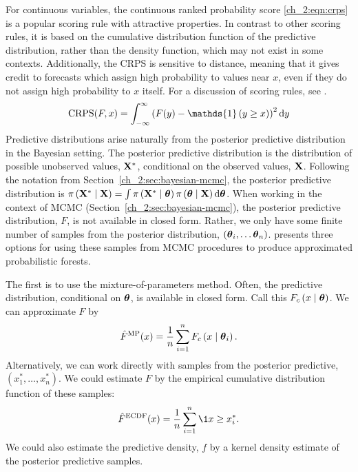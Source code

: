 For continuous variables, the continuous ranked probability score \eqref{ch_2:eqn:crps} is a popular scoring rule with attractive properties.
In contrast to other scoring rules, it is based on the cumulative distribution function of the predictive distribution, rather than the density function, which may not exist in some contexts.
Additionally, the CRPS is sensitive to distance, meaning that it gives credit to forecasts which assign high probability to values near \( x \), even if they do not assign high probability to \( x \) itself.
For a discussion of scoring rules, see \citet{gneiting2007strictly}.
\begin{equation}
    \operatorname{CRPS}(F, x) = \int_{-\infty}^{\infty} \left( F(y) - \mathds{1} \left( y \geq x \right) \right)^2 \rmd y
    \label{ch_2:eqn:crps}
\end{equation}
Predictive distributions arise naturally from the posterior predictive distribution in the Bayesian setting.
The posterior predictive distribution is the distribution of possible unobserved values, \( \mathbf{X}^* \), conditional on the observed values, \( \mathbf{X} \).
Following the notation from Section~\ref{ch_2:sec:bayesian-mcmc}, the posterior predictive distribution is \( \pi \left( \mathbf{X}^* \mid \mathbf{X} \right) = \int \pi \left( \mathbf{X}^* \mid \boldsymbol{\theta} \right) \pi \left( \boldsymbol{\theta} \mid \mathbf{X} \right) \mathrm{d} \boldsymbol{\theta} \).
When working in the context of MCMC (Section~\ref{ch_2:sec:bayesian-mcmc}), the posterior predictive distribution, \( F \), is not available in closed form.
Rather, we only have some finite number of samples from the posterior distribution, \( \left( \boldsymbol{\theta}_i, \ldots \boldsymbol{\theta}_n \right) \).
\citet{kruger2021predictive} presents three options for using these samples from MCMC procedures to produce approximated probabilistic forests.

The first is to use the mixture-of-parameters method.
Often, the predictive distribution, conditional on \( \boldsymbol{\theta} \), is available in closed form.
Call this \( F_c \left( x \mid \boldsymbol{\theta} \right) \).
We can approximate \( F \) by 
\begin{equation}
    \hat{F}^\mathrm{MP}(x) = \frac{1}{n} \sum_{i=1}^n F_c \left( x \mid \boldsymbol{\theta}_i \right).
\end{equation}
Alternatively, we can work directly with samples from the posterior predictive, \( \left( x^*_1, \ldots, x^*_n \right) \).
We could estimate \( F \) by the empirical cumulative distribution function of these samples:
\begin{equation}
    \hat{F}^\mathrm{ECDF}(x) = \frac{1}{n} \sum_{i=1}^n \1{x \geq x^*_i}.
\end{equation}
We could also estimate the predictive density, \( f \) by a kernel density estimate of the posterior predictive samples.

